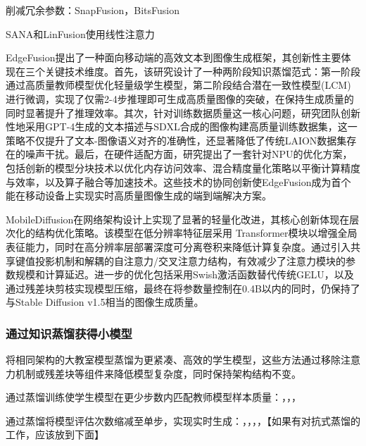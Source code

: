 \documentclass[11pt,a4paper,UTF8]{ctexart}
\begin{document}
削减冗余参数：SnapFusion\cite{li2023snapfusion}，BitsFusion\cite{sui2024bitsfusion}

SANA\cite{xie2024sana}和LinFusion\cite{liu2024linfusion}使用线性注意力\cite{cai2023efficientvit,dao2024transformers,katharopoulos2020transformers}

EdgeFusion\cite{castells2024edgefusion}提出了一种面向移动端的高效文本到图像生成框架，其创新性主要体现在三个关键技术维度。首先，该研究设计了一种两阶段知识蒸馏范式：第一阶段通过高质量教师模型优化轻量级学生模型，第二阶段结合潜在一致性模型(LCM)\cite{luo2023latent}进行微调，实现了仅需2-4步推理即可生成高质量图像的突破，在保持生成质量的同时显著提升了推理效率。其次，针对训练数据质量这一核心问题，研究团队创新性地采用GPT-4生成的文本描述与SDXL合成的图像构建高质量训练数据集，这一策略不仅提升了文本-图像语义对齐的准确性，还显著降低了传统LAION数据集存在的噪声干扰。最后，在硬件适配方面，研究提出了一套针对NPU的优化方案，包括创新的模型分块技术以优化内存访问效率、混合精度量化策略以平衡计算精度与效率，以及算子融合等加速技术。这些技术的协同创新使EdgeFusion成为首个能在移动设备上实现实时高质量图像生成的端到端解决方案。

MobileDiffusion\cite{zhao2024mobilediffusion}在网络架构设计上实现了显著的轻量化改进，其核心创新体现在层次化的结构优化策略。该模型在低分辨率特征层采用 Transformer模块以增强全局表征能力，同时在高分辨率层部署深度可分离卷积来降低计算复杂度。通过引入共享键值投影机制和解耦的自注意力/交叉注意力结构，有效减少了注意力模块的参数规模和计算延迟。进一步的优化包括采用Swish激活函数替代传统GELU，以及通过残差块剪枝实现模型压缩，最终在将参数量控制在0.4B以内的同时，仍保持了与Stable Diffusion v1.5相当的图像生成质量。

\subsubsection{通过知识蒸馏获得小模型}

将相同架构的大教室模型蒸馏为更紧凑、高效的学生模型\cite{kim2023bk,liu2024linfusion}，这些方法通过移除注意力机制\cite{vaswani2017attention}或残差块\cite{he2016deep}等组件来降低模型复杂度，同时保持架构结构不变。

通过蒸馏训练使学生模型在更少步数内匹配教师模型样本质量：\cite{luo2023lcm}，\cite{meng2023distillation}，\cite{salimans2022progressive}，\cite{song2023consistency}

通过蒸馏将模型评估次数缩减至单步，实现实时生成：\cite{lin2024sdxl}，\cite{luo2023lcm}，\cite{sauer2024adversarial}，\cite{xu2024ufogen}，\cite{yin2024one}【如果有对抗式蒸馏的工作，应该放到下面】
\end{document}
